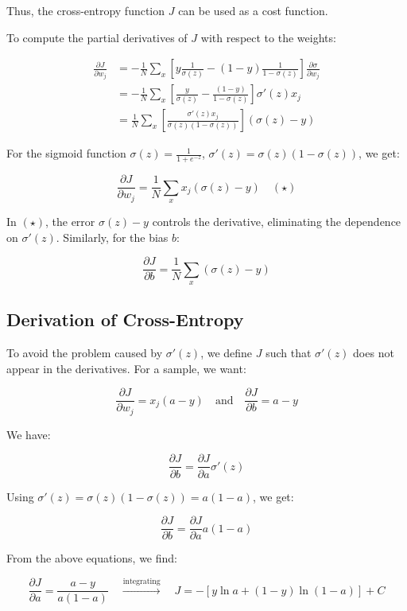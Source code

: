 Thus, the cross-entropy function \( J \) can be used as a cost function.

To compute the partial derivatives of \( J \) with respect to the weights:

\[
\begin{split}
    \frac{\partial J}{\partial w_j} &= -\frac{1}{N} \sum_x \left[y \frac{1}{\sigma(z)} - (1 - y) \frac{1}{1 - \sigma(z)} \right] \frac{\partial \sigma}{\partial w_j} \\
    &= -\frac{1}{N} \sum_x \left[\frac{y}{\sigma(z)} - \frac{(1 - y)}{1 - \sigma(z)} \right] \sigma'(z) x_j \\
    &= \frac{1}{N} \sum_x \left[\frac{\sigma'(z) x_j}{\sigma(z) (1 - \sigma(z))} \right](\sigma(z) - y)
\end{split}
\]

For the sigmoid function \(\sigma(z) = \frac{1}{1 + e^{-z}}\), \(\sigma'(z) = \sigma(z)(1 - \sigma(z))\), we get:

\[
\frac{\partial J}{\partial w_j} = \frac{1}{N} \sum_x x_j (\sigma(z) - y) \quad (\star)
\]

In \((\star)\), the error \(\sigma(z) - y\) controls the derivative, eliminating the dependence on \(\sigma'(z)\). Similarly, for the bias \( b \):

\[
\frac{\partial J}{\partial b} = \frac{1}{N} \sum_x (\sigma(z) - y)
\]

\subsection*{Derivation of Cross-Entropy}

To avoid the problem caused by \(\sigma'(z)\), we define \( J \) such that \(\sigma'(z)\) does not appear in the derivatives. For a sample, we want:

\[
\frac{\partial J}{\partial w_j} = x_j (a - y) \quad \text{and} \quad \frac{\partial J}{\partial b} = a - y
\]

We have:

\[
\frac{\partial J}{\partial b} = \frac{\partial J}{\partial a} \sigma'(z)
\]

Using \(\sigma'(z) = \sigma(z)(1 - \sigma(z)) = a(1 - a)\), we get:

\[
\frac{\partial J}{\partial b} = \frac{\partial J}{\partial a} a(1 - a)
\]

From the above equations, we find:

\[
\frac{\partial J}{\partial a} = \frac{a - y}{a(1 - a)} \quad \overset{\text{integrating}}{\longrightarrow} \quad J = -[y \ln a + (1 - y) \ln (1 - a)] + C
\]


